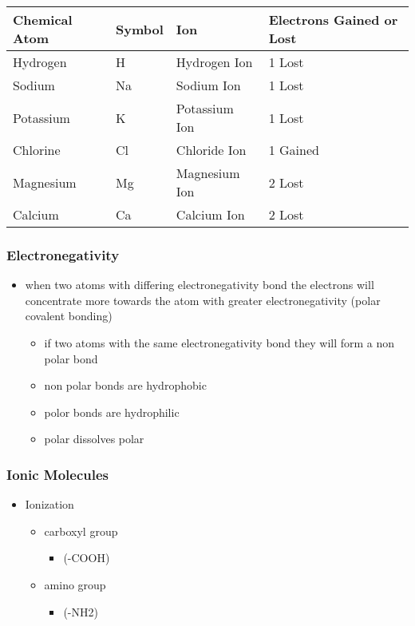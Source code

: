 \documentclass[11pt]{article}
\begin{document}
\begin{center}
\begin{tabular}{llll}
Chemical Atom & Symbol & Ion & Electrons Gained or Lost\\
\hline
Hydrogen & H & Hydrogen Ion & 1 Lost\\
Sodium & Na & Sodium Ion & 1 Lost\\
Potassium & K & Potassium Ion & 1 Lost\\
Chlorine & Cl & Chloride Ion & 1 Gained\\
Magnesium & Mg & Magnesium Ion & 2 Lost\\
Calcium & Ca & Calcium Ion & 2 Lost\\
\end{tabular}
\end{center}
\subsubsection{Electronegativity}
\label{sec:orgdd0b462}
\begin{itemize}
\item when two atoms with differing electronegativity bond the electrons will concentrate more towards the atom with greater electronegativity (polar covalent bonding)
\begin{itemize}
\item if two atoms with the same electronegativity bond they will form a non polar bond
\item non polar bonds are hydrophobic
\item polor bonds are hydrophilic
\item polar dissolves polar
\end{itemize}
\end{itemize}
\subsubsection{Ionic Molecules}
\label{sec:org9f02e2d}
\begin{itemize}
\item Ionization
\begin{itemize}
\item carboxyl group
\begin{itemize}
\item (-COOH)
\end{itemize}
\item amino group
\begin{itemize}
\item (-NH2)
\end{itemize}
\end{itemize}
\end{itemize}
\end{document}
